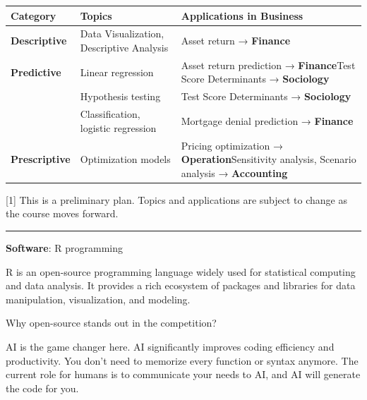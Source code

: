 \documentclass[
  12pt,
  letterpaper,
]{scrbook}
\theoremstyle{definition}
\theoremstyle{plain}
\theoremstyle{remark}
\begin{document}
\begin{longtable}[]{@{}
  >{\raggedright\arraybackslash}p{}
  >{\raggedright\arraybackslash}p{}
  >{\raggedright\arraybackslash}p{}@{}}
\toprule\noalign{}
\begin{minipage}[b]{\linewidth}\raggedright
\textbf{Category}
\end{minipage} & \begin{minipage}[b]{\linewidth}\raggedright
\textbf{Topics}
\end{minipage} & \begin{minipage}[b]{\linewidth}\raggedright
\textbf{Applications in Business}
\end{minipage} \\
\midrule\noalign{}
\endhead
\bottomrule\noalign{}
\endlastfoot
\textbf{Descriptive} & Data Visualization, Descriptive Analysis & Asset
return → \textbf{Finance} \\
\textbf{Predictive} & Linear regression & Asset return prediction →
\textbf{Finance}Test Score Determinants → \textbf{Sociology} \\
& Hypothesis testing & Test Score Determinants → \textbf{Sociology} \\
& Classification, logistic regression & Mortgage denial prediction →
\textbf{Finance} \\
\textbf{Prescriptive} & Optimization models & Pricing optimization →
\textbf{Operation}Sensitivity analysis, Scenario analysis →
\textbf{Accounting} \\
\end{longtable}

{[}1{]} This is a preliminary plan. Topics and applications are subject
to change as the course moves forward.

\begin{center}\rule{0.5\linewidth}{0.5pt}\end{center}

\textbf{Software}: R programming

R is an open-source programming language widely used for statistical
computing and data analysis. It provides a rich ecosystem of packages
and libraries for data manipulation, visualization, and modeling.

Why open-source stands out in the competition?

AI is the game changer here. AI significantly improves coding efficiency
and productivity. You don't need to memorize every function or syntax
anymore. The current role for humans is to communicate your needs to AI,
and AI will generate the code for you.
\end{document}
